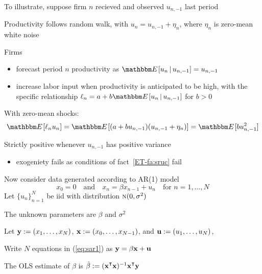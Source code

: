 \begin{frame}

    \vspace{2em}
    To illustrate, suppose firm $n$ recieved and observed $u_{n,-1}$ last period
    
    Productivity follows random walk, with $u_n = u_{n, -1} + \eta_n$,
    where $\eta_n$ is zero-mean white noise
    
    \vspace{.7em}
    Firms
    \begin{itemize}
        \item forecast
    period $n$ productivity as $\EE[u_n \given u_{n,-1}] = u_{n,-1}$
        \item  increase labor input when productivity is anticipated
    to be high, with the specific relationship $\ell_n = a + b \EE[u_n \given
    u_{n,-1}]$ for $b > 0$
    \end{itemize}
    
\end{frame}

\begin{frame}

    \vspace{2em}
    With zero-mean shocks:
    \begin{equation*}
        \EE[ \ell_n u_n ] 
        = \EE[ (a + b u_{n,-1})(u_{n,-1} + \eta_n) ]
        = \EE[ b u_{n,-1}^2 ]
    \end{equation*}
    
    \vspace{.7em}
    Strictly positive whenever $u_{n,-1}$ has positive variance
    \begin{itemize}
        \item exogeniety fails as conditions of fact~\ref{ET-fa:sruc} fail
    \end{itemize}

\end{frame}

\begin{frame}
    
    \vspace{2em}
    Now consider data generated according to AR(1) model
    \begin{equation}
        \label{eq:sar1}
        x_0 = 0 
        \quad \text{and} \quad
        x_n = \beta x_{n-1} + u_n
        \quad \text{for } 
        n = 1,\ldots,N
    \end{equation}
    Let $\{u_n\}_{n=1}^N$ be {\sc iid} with distribution $\textrm{\sc n}(0,\sigma^2)$
    
    \vspace{.7em}
    The unknown parameters are $\beta$ and $\sigma^2$
    
    Let ${\mathbf y} := (x_1,\ldots,x_N)$,
        ${\mathbf x} := (x_0,\ldots,x_{N-1})$,
        and ${\mathbf u} := (u_1,\ldots,u_N)$,\
        
    Write $N$ equations in (\ref{eq:sar1}) as ${\mathbf y} = \beta {\mathbf x} +
    {\mathbf u}$
    
    The OLS estimate of $\beta$ is
        $\hat \beta := (\boldx^\T \boldx)^{-1} \boldx^\T\boldy$
    
\end{frame}

